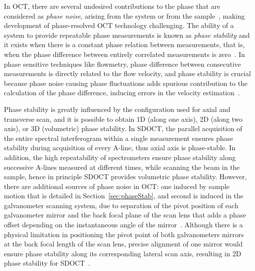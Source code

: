 In OCT, there are several undesired contributions to the phase that are considered as \textit{phase noise}, arising from the system or from the sample~\cite{Vakoc2005_Phaseresolved, Shemonski2014_Stability}, making development of phase-resolved OCT technology challenging. The ability of a system to provide repeatable phase measurements is known as \textit{phase stability} and it exists when there is a constant phase relation between measurements, that is, when the phase difference between entirely correlated measurements is zero~\cite{Shemonski2014_Stability}. In phase sensitive techniques like flowmetry, phase difference between consecutive measurements is directly related to the flow velocity, and phase stability is crucial because phase noise causing phase fluctuations adds spurious contribution to the calculation of the phase difference, inducing errors in the velocity estimation~\cite{White2003_vivo}.

Phase stability is greatly influenced by the configuration used for axial and transverse scan, and it is possible to obtain 1D (along one axis), 2D (along two axis), or 3D (volumetric) phase stability. In SDOCT, the parallel acquisition of the entire spectral interferogram within a single measurement ensures phase stability during acquisition of every A-line, thus axial axis is phase-stable. In addition, the high repeatability of spectrometers ensure phase stability along successive A-lines measured at different times, while scanning the beam in the sample, hence in principle SDOCT provides volumetric phase stability. However, there are additional sources of phase noise in OCT: one induced by sample motion that is detailed in Section~\ref{sec:phaseStab}, and second is induced in the galvanometer scanning system, due to separation of the pivot position of each galvanometer mirror and the back focal plane of the scan lens that adds a phase offset depending on the instantaneous angle of the mirror~\cite{Shemonski2014_Stability}. Although there is a physical limitation in positioning the pivot point of both galvanometers mirrors at the back focal length of the scan lens, precise alignment of one mirror would ensure phase stability along its corresponding lateral scan axis, resulting in 2D phase stability for SDOCT~\cite{Vakoc2009_Statistical}.

